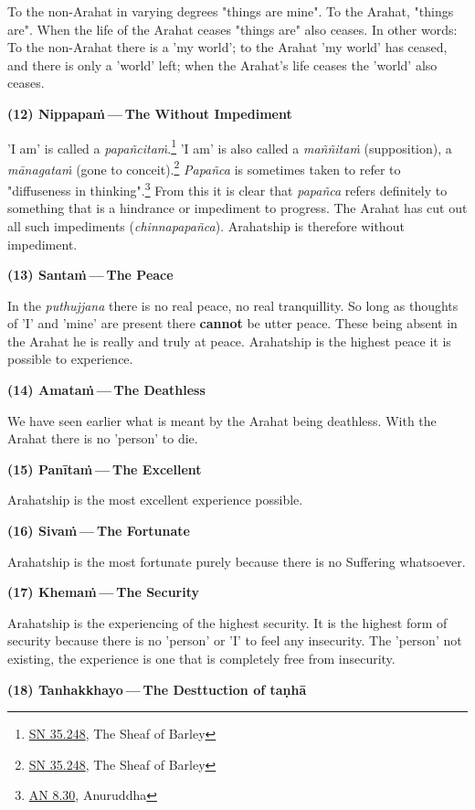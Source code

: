 To the non-Arahat in varying degrees "things are mine". To the Arahat, "things are". When the life of the Arahat ceases "things are" also ceases. In other words: To the non-Arahat there is a 'my world'; to the Arahat 'my world' has ceased, and there is only a 'world' left; when the Arahat's life ceases the 'world' also ceases.

\textbf{(12) Nippapaṁ --- The Without Impediment}

'I am' is called a \emph{papañcitaṁ}.\footnote{\href{https://suttacentral.net/sn35.248/en/bodhi}{SN 35.248}, The Sheaf of Barley} 'I am' is also called a \emph{maññitaṁ} (supposition), a \emph{mānagataṁ} (gone to conceit).\footnote{\href{https://suttacentral.net/sn35.248/en/bodhi}{SN 35.248}, The Sheaf of Barley} \emph{Papañca} is sometimes taken to refer to "diffuseness in thinking".\footnote{\href{https://suttacentral.net/an8.30/en/bodhi}{AN 8.30}, Anuruddha} From this it is clear that \emph{papañca} refers definitely to something that is a hindrance or impediment to progress. The Arahat has cut out all such impediments (\emph{chinnapapañca}). Arahatship is therefore without impediment.

\textbf{(13) Santaṁ --- The Peace}

In the \emph{puthujjana} there is no real peace, no real tranquillity. So long as thoughts of 'I' and 'mine' are present there \textbf{cannot} be utter peace. These being absent in the Arahat he is really and truly at peace. Arahatship is the highest peace it is possible to experience.

\textbf{(14) Amataṁ --- The Deathless}

We have seen earlier what is meant by the Arahat being deathless. With the Arahat there is no 'person' to die.

\textbf{(15) Panītaṁ --- The Excellent}

Arahatship is the most excellent experience possible.

\textbf{(16) Sivaṁ --- The Fortunate}

Arahatship is the most fortunate purely because there is no Suffering whatsoever.

\textbf{(17) Khemaṁ --- The Security}

Arahatship is the experiencing of the highest security. It is the highest form of security because there is no 'person' or 'I' to feel any insecurity. The 'person' not existing, the experience is one that is completely free from insecurity.

\textbf{(18) Tanhakkhayo --- The Desttuction of taṇhā}

